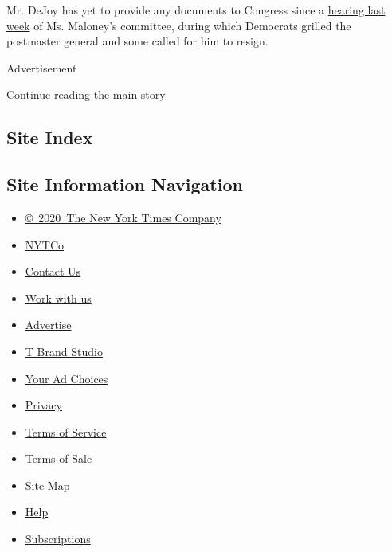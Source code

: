 Mr. DeJoy has yet to provide any documents to Congress since a
\href{https://www.nytimes3xbfgragh.onion/2020/08/24/us/politics/louis-dejoy-post-office-hearing.html}{hearing
last week} of Ms. Maloney's committee, during which Democrats grilled
the postmaster general and some called for him to resign.

Advertisement

\protect\hyperlink{after-bottom}{Continue reading the main story}

\hypertarget{site-index}{%
\subsection{Site Index}\label{site-index}}

\hypertarget{site-information-navigation}{%
\subsection{Site Information
Navigation}\label{site-information-navigation}}

\begin{itemize}
\tightlist
\item
  \href{https://help.nytimes3xbfgragh.onion/hc/en-us/articles/115014792127-Copyright-notice}{©~2020~The
  New York Times Company}
\end{itemize}

\begin{itemize}
\tightlist
\item
  \href{https://www.nytco.com/}{NYTCo}
\item
  \href{https://help.nytimes3xbfgragh.onion/hc/en-us/articles/115015385887-Contact-Us}{Contact
  Us}
\item
  \href{https://www.nytco.com/careers/}{Work with us}
\item
  \href{https://nytmediakit.com/}{Advertise}
\item
  \href{http://www.tbrandstudio.com/}{T Brand Studio}
\item
  \href{https://www.nytimes3xbfgragh.onion/privacy/cookie-policy\#how-do-i-manage-trackers}{Your
  Ad Choices}
\item
  \href{https://www.nytimes3xbfgragh.onion/privacy}{Privacy}
\item
  \href{https://help.nytimes3xbfgragh.onion/hc/en-us/articles/115014893428-Terms-of-service}{Terms
  of Service}
\item
  \href{https://help.nytimes3xbfgragh.onion/hc/en-us/articles/115014893968-Terms-of-sale}{Terms
  of Sale}
\item
  \href{https://spiderbites.nytimes3xbfgragh.onion}{Site Map}
\item
  \href{https://help.nytimes3xbfgragh.onion/hc/en-us}{Help}
\item
  \href{https://www.nytimes3xbfgragh.onion/subscription?campaignId=37WXW}{Subscriptions}
\end{itemize}
